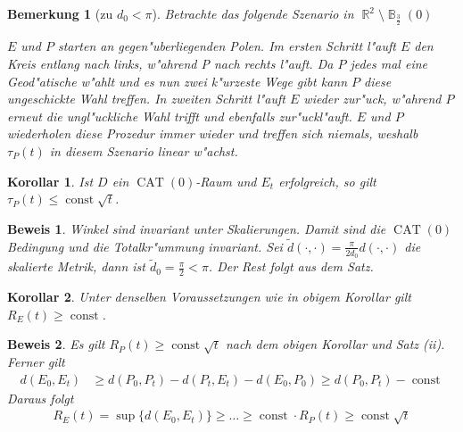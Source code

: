 \documentclass[paper=A4, twoside, chapterprefix=true, bibliography=totoc, headsepline]{scrbook}
\newcommand{\tikzgitter}[3][0.25]{ %
	\draw[step=#1,gray!15] #2 grid #3;
	\draw[step=2*#1,gray!30] #2 grid #3;
	\fill (0,0) circle(0.1); 
}
\DeclareMathOperator{\B}{\mathbb{B}} %
\DeclareMathOperator{\R}{\mathbb{R}}
\DeclareMathOperator{\const}{const} %
\DeclareMathOperator{\CAT}{CAT}
\theoremstyle{break}
\theoremstyle{nonumberbreak}
\newtheorem{kor}{Korollar}
\newtheorem{bem}{Bemerkung}
\newtheorem{bew}{Beweis}
\theoremstyle{emptybreak}
\theoremstyle{break}
\begin{document}
\begin{bem}[zu $d_0 < \pi$]
Betrachte das folgende Szenario in $\R^2 \setminus \B_{\frac{3}{2}}(0)$
\begin{center}\end{center}
$E$ und $P$ starten an gegen"uberliegenden Polen.
Im ersten Schritt l"auft $E$ den Kreis entlang nach links, w"ahrend P nach rechts l"auft.
Da $P$ jedes mal eine Geod"atische w"ahlt und es nun zwei k"urzeste Wege gibt kann $P$ diese ungeschickte Wahl treffen.
In zweiten Schritt l"auft $E$ wieder zur"uck, w"ahrend $P$ erneut die ungl"uckliche Wahl trifft und ebenfalls zur"uckl"auft.
$E$ und $P$ wiederholen diese Prozedur immer wieder und treffen sich niemals, weshalb $\tau_P(t)$ in diesem Szenario linear w"achst.
\end{bem}

\begin{kor}
Ist $D$ ein $\CAT(0)$-Raum und $E_t$ erfolgreich, so gilt $\tau_P(t) \le \const \sqrt{t}$.
\end{kor}

\begin{bew}
Winkel sind invariant unter Skalierungen.
Damit  sind die $\CAT(0)$ Bedingung und die Totalkr"ummung invariant.
Sei $\tilde{d}(\cdot, \cdot) = \frac{\pi}{2 d_0} d(\cdot, \cdot)$ die skalierte Metrik, dann ist $\tilde{d}_0 = \frac{\pi}{2} < \pi$.
Der Rest folgt aus dem Satz.
\end{bew}

\begin{kor}
Unter denselben Voraussetzungen wie in obigem Korollar gilt $R_E(t) \ge \const$.
\end{kor}

\begin{bew}
Es gilt $R_P(t) \ge \const \sqrt{t}$ nach dem obigen Korollar und Satz (ii).
Ferner gilt
\begin{align*}
	d(E_0, E_t) &\ge d(P_0, P_t) - d(P_t, E_t) - d(E_0,P_0) \ge d(P_0, P_t) - \const
\end{align*}
Daraus folgt
\begin{align*}
	R_E(t) = \sup \{ d(E_0, E_t) \} \ge \ldots \ge \const \cdot R_P(t) \ge \const \sqrt t
\end{align*}
\end{bew}
\end{document}
